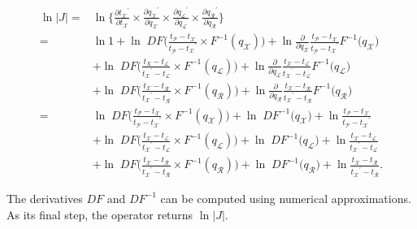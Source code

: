 \documentclass[12pt]{article}
\begin{document}
\begin{align}
	\ln |J| =&  \ln \{ \frac{\partial {t_\mathcal{X}}^\prime}{\partial t_\mathcal{X}} \times \frac{\partial {q_\mathcal{X}}^\prime}{\partial q_\mathcal{X}} \times \frac{\partial {q_\mathcal{L}}^\prime}{\partial q_\mathcal{L}} \times \frac{\partial {q_\mathcal{R}}^\prime}{\partial q_\mathcal{R}} \} \nonumber\\
		=& \ln 1 + \ln \; D F\Big( \frac{t_\mathcal{P} - t_\mathcal{X}}{t_\mathcal{P} - {t_\mathcal{X}}^\prime} \times F^{-1}(q_\mathcal{X})  \Big) + \ln \frac{\partial}{\partial q_\mathcal{X}}  \frac{t_\mathcal{P} - t_\mathcal{X}}{t_\mathcal{P} - {t_\mathcal{X}}^\prime} F^{-1} \Big( q_\mathcal{X} \Big) \nonumber\\
		& + \ln \; DF\Big( \frac{t_X - t_\mathcal{L}}{{t_\mathcal{X}}^\prime - t_\mathcal{L}} \times F^{-1}(q_\mathcal{L}) \Big) + \ln \frac{\partial}{\partial q_\mathcal{L}} \frac{t_\mathcal{X} - t_\mathcal{L}}{{t_\mathcal{X}}^\prime - t_\mathcal{L}} F^{-1} \Big( q_\mathcal{L} \Big) \nonumber\\
		& + \ln \; D F\Big( \frac{t_\mathcal{X} - t_\mathcal{R}}{{t_\mathcal{X}}^\prime - t_\mathcal{R}} \times F^{-1}(q_\mathcal{R}) \Big) + \ln \frac{\partial}{\partial q_\mathcal{R}} \frac{t_\mathcal{X} - t_\mathcal{R}}{{t_\mathcal{X}}^\prime - t_\mathcal{R}} F^{-1} \Big( q_\mathcal{R} \Big) \nonumber\\
		=& \ln \; D F\Big( \frac{t_\mathcal{P} - t_\mathcal{X}}{t_\mathcal{P} - {t_\mathcal{X}}^\prime} \times F^{-1}(q_\mathcal{X})  \Big) + \ln \; D  F^{-1} \Big( q_\mathcal{X} \Big) + \ln \frac{t_\mathcal{P} - t_\mathcal{X}}{t_\mathcal{P} - {t_\mathcal{X}}^\prime} \nonumber\\
		& + \ln \; DF\Big( \frac{t_\mathcal{X} - t_\mathcal{L}}{{t_\mathcal{X}}^\prime - t_\mathcal{L}} \times F^{-1}(q_\mathcal{L}) \Big) + \ln \; D F^{-1} \Big( q_\mathcal{L} \Big) + \ln  \frac{t_\mathcal{X} - t_\mathcal{L}}{{t_\mathcal{X}}^\prime - t_\mathcal{L}} \nonumber \\
		& + \ln \; D F\Big( \frac{t_\mathcal{X} - t_\mathcal{R}}{{t_\mathcal{X}}^\prime - t_\mathcal{R}} \times F^{-1}(q_\mathcal{R}) \Big) + \ln \; DF^{-1} \Big( q_\mathcal{R} \Big) + \ln \frac{t_\mathcal{X} - t_\mathcal{R}}{{t_\mathcal{X}}^\prime - t_\mathcal{R}} .
\end{align}







The derivatives $DF$ and $DF^{-1}$ can be computed using numerical approximations.
 As its final step, the operator returns $\ln |J|$. 
\end{document}
